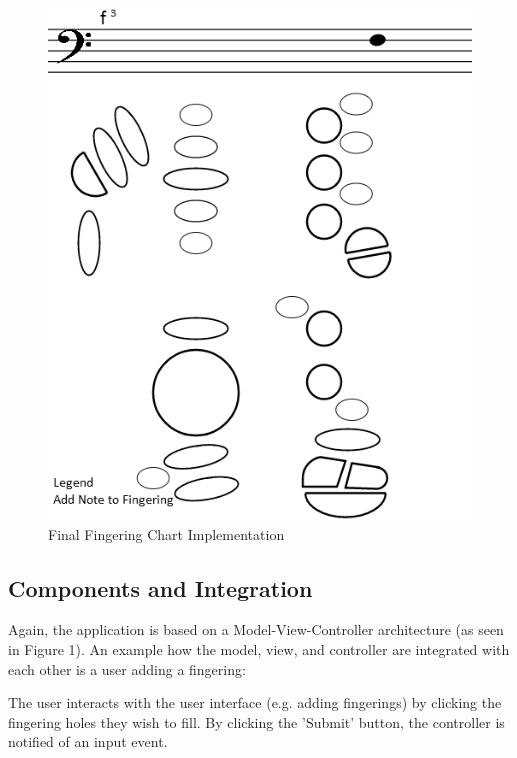 \documentclass[12pt,english]{article}
\begin{document}
\begin{figure}[H]
\begin{centering}
\caption{Final Fingering Chart Implementation}

\par\end{centering}

\centering{}\includegraphics[scale=0.6]{fingering_implement}
\end{figure}



\subsection{Components and Integration}

Again, the application is based on a Model-View-Controller architecture
(as seen in Figure 1). An example how the model, view, and controller
are integrated with each other is a user adding a fingering: 

The user interacts with the user interface (e.g. adding fingerings)
by clicking the fingering holes they wish to fill. By clicking the
'Submit' button, the controller is notified of an input event. 
\end{document}
